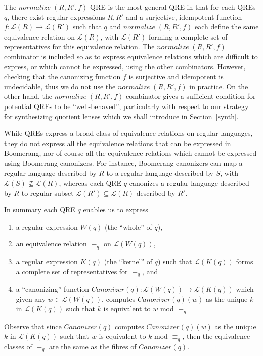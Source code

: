 \documentclass{svproc}
\newcommand{\normalize}[3]{\ensuremath{\mathit{normalize} \; (#1, #2, #3)}}
\newcommand{\canonizer}{\ensuremath{\mathit{Canonizer}}}
\newcommand{\eqrel}[1]{\ensuremath{\equiv_{#1}}}
\begin{document}
The $\normalize{R}{R'}{f}$ QRE is the most general QRE in that for each QREs
$q$, there exist regular expressions $R, R'$ and a surjective, idempotent
function $f:\mathcal{L}(R) \longrightarrow \mathcal{L}(R')$ such that $q$ and
$\normalize{R}{R'}{f}$ each define the same equivalence relation on
$\mathcal{L}(R)$, with $\mathcal{L}(R')$ forming a complete set of
representatives for this equivalence relation. The $\normalize{R}{R'}{f}$
combinator is included so as to express equivalence relations which are
difficult to express, or which cannot be expressed, using the other
combinators. However, checking that the canonizing function $f$ is
surjective and idempotent is undecidable, thus we do not use the
$\normalize{R}{R'}{f}$ in practice. On the other hand, the
$\normalize{R}{R'}{f}$ combinator gives a sufficient condition for potential
QREs to be ``well-behaved'', particularly with respect to our strategy for
synthesizing quotient lenses which we shall introduce in Section~\ref{synth}.

While QREs express a broad class of equivalence relations on regular languages,
they do not express all the equivalence relations that can be expressed in
Boomerang, nor of course all the equivalence relations which cannot be
expressed using Boomerang canonizers. For instance, Boomerang canonizers can
map a regular language described by $R$ to a regular language described by
$S$, with $\mathcal{L}(S) \not \subseteq \mathcal{L}(R)$, whereas each QRE $q$
canonizes a regular language described by $R$ to regular subset
$\mathcal{L}(R') \subseteq \mathcal{L}(R)$ described by $R'$.

In summary each QRE $q$ enables us to express
\begin{enumerate}
  \item a regular expression $W(q)$ (the ``whole'' of $q$),
  \item an equivalence relation $\eqrel{q}$ on $\mathcal{L}(W(q))$,
  \item a regular expression $K(q)$ (the ``kernel'' of $q$)
  such that $\mathcal{L}(K(q))$ forms a complete set of representatives for
  $\eqrel{q}$, and
  \item a ``canonizing'' function $\canonizer(q):\mathcal{L}(W(q))
  \longrightarrow \mathcal{L}(K(q))$ which given any $w \in \mathcal{L}(W(q))$,
  computes $\canonizer(q)(w)$ as the unique $k$ in $\mathcal{L}(K(q))$ such that
  $k$ is equivalent to $w$ mod $\eqrel{q}$
  \end{enumerate}
  Observe that since $\canonizer(q)$ computes $\canonizer(q)(w)$ as the unique
  $k$ in $\mathcal{L}(K(q))$ such that $w$ is equivalent to $k$ mod $\eqrel{q}$,
  then the equivalence classes of $\eqrel{q}$ are the same as the fibres of
  $\canonizer(q)$.
\end{document}
